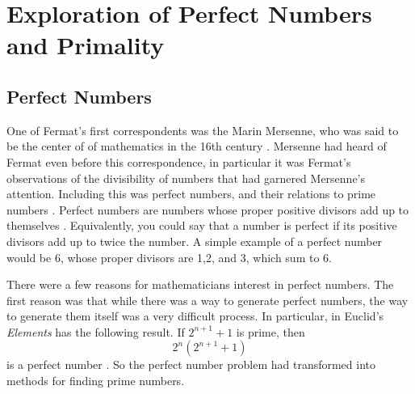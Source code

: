 \documentclass[11pt]{article}
\begin{document}
\section*{Exploration of Perfect Numbers and Primality}

\subsection*{Perfect Numbers}
One of Fermat's first correspondents was the Marin Mersenne, who was said to be
the center of of mathematics in the 16th century \cite{Mersenne}.
Mersenne had heard of Fermat even before this correspondence, in particular it
was Fermat's observations of the divisibility of numbers that had garnered 
Mersenne's attention.
Including this was perfect numbers, and their relations to prime
numbers \cite{Mahoney}.
Perfect numbers are numbers whose proper positive divisors add up to
themselves \cite{PerfectNumbers}.
Equivalently, you could say that a number is perfect if its positive divisors
add up to twice the number.
A simple example of a perfect number would be 6, whose proper divisors are
1,2, and 3, which sum to 6.

There were a few reasons for mathematicians interest in perfect numbers.
The first reason was that while there was a way to generate perfect numbers,
the way to generate them itself was a very difficult process.
In particular, in Euclid's \emph{Elements} has the following result.
If $2^{n+1} + 1$ is prime, then \[ 2^n(2^{n+1} + 1)\]
is a perfect number \cite{Euclid,Mahoney}.
So the perfect number problem had transformed into methods for
finding prime numbers.
\end{document}
